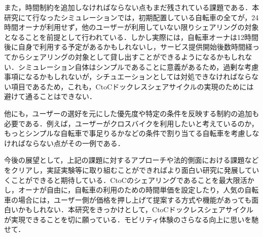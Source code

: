     \par また，時間制約を追加しなければならない点もまだ残されている課題である．本研究にて行なったシミュレーションでは，初期配置している自転車の全てが，24時間オーナが利用せず，他のユーザーが利用していない限りシェアリングの対象となることを前提として行われている．しかし実際には，自転車オーナは12時間後に自身で利用する予定があるかもしれないし，サービス提供開始後数時間経ってからシェアリングの対象として貸し出すことができるようになるかもしれない．シミュレーション自体はシンプルであることに意義があるため，過剰な考慮事項になるかもしれないが，シチュエーションとしては対処できなければならない項目であるため，これも，CtoCドックレスシェアサイクルの実現のためには避けて通ることはできない．
    \par 他にも，ユーザーの選好を元にした優先度や特定の条件を反映する制約の追加も必要である．例えば，ユーザーがクロスバイクを利用したいと考えているのか，もっとシンプルな自転車で事足りるかなどの条件で割り当てる自転車を考慮しなければならない点がその一例である．
    \par 今後の展望として，上記の課題に対するアプローチや法的側面における課題などをクリアし，実証実験等に取り組むことができればより面白い研究に発展していくことができると期待している．CtoCのシェアリングであることを最大限活かし，オーナが自由に，自転車の利用のための時間単価を設定したり，人気の自転車の場合には，ユーザー側が価格を押し上げて提案する方式や機能があっても面白いかもしれない．本研究をきっかけとして，CtoCドックレスシェアサイクルが実現できることを切に願っている．モビリティ体験のさらなる向上に思いを馳せて．
